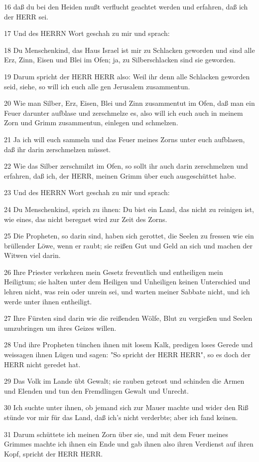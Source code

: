 \par 16 daß du bei den Heiden mußt verflucht geachtet werden und erfahren, daß ich der HERR sei.
\par 17 Und des HERRN Wort geschah zu mir und sprach:
\par 18 Du Menschenkind, das Haus Israel ist mir zu Schlacken geworden und sind alle Erz, Zinn, Eisen und Blei im Ofen; ja, zu Silberschlacken sind sie geworden.
\par 19 Darum spricht der HERR HERR also: Weil ihr denn alle Schlacken geworden seid, siehe, so will ich euch alle gen Jerusalem zusammentun.
\par 20 Wie man Silber, Erz, Eisen, Blei und Zinn zusammentut im Ofen, daß man ein Feuer darunter aufblase und zerschmelze es, also will ich euch auch in meinem Zorn und Grimm zusammentun, einlegen und schmelzen.
\par 21 Ja ich will euch sammeln und das Feuer meines Zorns unter euch aufblasen, daß ihr darin zerschmelzen müsset.
\par 22 Wie das Silber zerschmilzt im Ofen, so sollt ihr auch darin zerschmelzen und erfahren, daß ich, der HERR, meinen Grimm über euch ausgeschüttet habe.
\par 23 Und des HERRN Wort geschah zu mir und sprach:
\par 24 Du Menschenkind, sprich zu ihnen: Du bist ein Land, das nicht zu reinigen ist, wie eines, das nicht beregnet wird zur Zeit des Zorns.
\par 25 Die Propheten, so darin sind, haben sich gerottet, die Seelen zu fressen wie ein brüllender Löwe, wenn er raubt; sie reißen Gut und Geld an sich und machen der Witwen viel darin.
\par 26 Ihre Priester verkehren mein Gesetz freventlich und entheiligen mein Heiligtum; sie halten unter dem Heiligen und Unheiligen keinen Unterschied und lehren nicht, was rein oder unrein sei, und warten meiner Sabbate nicht, und ich werde unter ihnen entheiligt.
\par 27 Ihre Fürsten sind darin wie die reißenden Wölfe, Blut zu vergießen und Seelen umzubringen um ihres Geizes willen.
\par 28 Und ihre Propheten tünchen ihnen mit losem Kalk, predigen loses Gerede und weissagen ihnen Lügen und sagen: "So spricht der HERR HERR", so es doch der HERR nicht geredet hat.
\par 29 Das Volk im Lande übt Gewalt; sie rauben getrost und schinden die Armen und Elenden und tun den Fremdlingen Gewalt und Unrecht.
\par 30 Ich suchte unter ihnen, ob jemand sich zur Mauer machte und wider den Riß stünde vor mir für das Land, daß ich's nicht verderbte; aber ich fand keinen.
\par 31 Darum schüttete ich meinen Zorn über sie, und mit dem Feuer meines Grimmes machte ich ihnen ein Ende und gab ihnen also ihren Verdienst auf ihren Kopf, spricht der HERR HERR.

